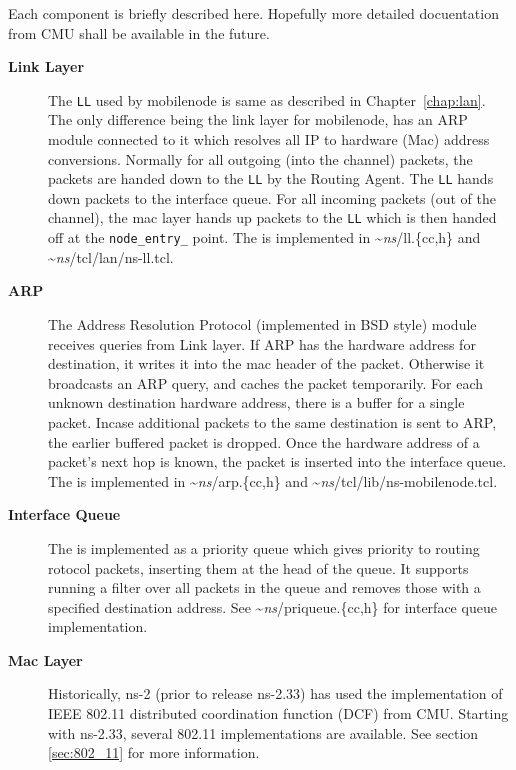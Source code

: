 Each component is briefly described here. Hopefully more detailed
docuentation from CMU shall be available in the future. 
\begin{description}
\item[{\bf Link Layer}] The {\tt LL} used by mobilenode is same as
  described in Chapter~\ref{chap:lan}. The only difference being the
  link layer for mobilenode, has an ARP module connected to it which
  resolves all IP to hardware (Mac) address conversions. Normally for
  all outgoing (into the channel) packets, the packets are handed down
  to the {\tt LL} by the Routing Agent. The {\tt LL} hands down
  packets to the interface queue. For all incoming packets (out of the
  channel), the mac layer hands up packets to the {\tt LL} which is
  then handed off at the {\tt node\_entry\_} point. The
   is implemented in \textasciitilde\emph{ns}/{ll.\{cc,h\}} and
  \textasciitilde\emph{ns}/{tcl/lan/ns-ll.tcl}.

\item [{\bf ARP}] The Address Resolution Protocol (implemented in BSD
  style) module receives queries from Link layer. If ARP has the
  hardware address for destination, it writes it into the mac header
  of the packet. Otherwise it broadcasts an ARP query, and caches the
  packet temporarily. For each unknown destination hardware address,
  there is a buffer for a single packet. Incase additional packets to
  the same destination is sent to ARP, the earlier buffered packet is
  dropped. Once the hardware address of a
  packet's next hop is known, the packet is inserted into the
  interface queue. The  is implemented
  in \textasciitilde\emph{ns}/{arp.\{cc,h\}} and \textasciitilde\emph{ns}/{tcl/lib/ns-mobilenode.tcl}.

\item[{\bf Interface Queue}] The 
  is implemented as a priority queue which gives priority to routing  
  rotocol packets, inserting them at the head of the queue. It supports
  running a filter over all packets in the queue and removes those with
  a specified destination address. See \textasciitilde\emph{ns}/{priqueue.\{cc,h\}} for 
  interface queue implementation.

\item[{\bf Mac Layer}] Historically, ns-2 (prior to release ns-2.33)
  has used the implementation of IEEE 802.11 distributed coordination 
  function (DCF) from CMU. Starting with ns-2.33, several 802.11 
  implementations are available.  See section \ref{sec:802_11} for
  more information.


\end{description}
